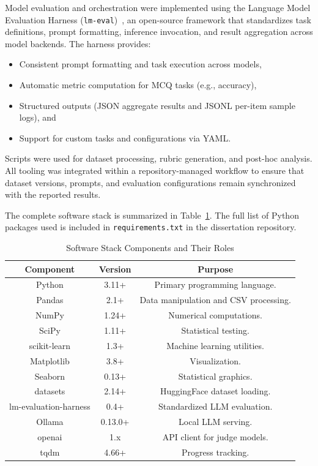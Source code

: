 Model evaluation and orchestration were implemented using the Language Model Evaluation Harness (\texttt{lm-eval})~\cite{gao_LanguageModelEvaluation_2024, eleutherai_EleutherAILmevaluationharness_2024, biderman_LessonsTrenchesReproducible_2024}, an open-source framework that standardizes task definitions, prompt formatting, inference invocation, and result aggregation across model backends. The harness provides:
\begin{itemize}
    \item Consistent prompt formatting and task execution across models,
    \item Automatic metric computation for MCQ tasks (e.g., accuracy),
    \item Structured outputs (JSON aggregate results and JSONL per-item sample logs), and
    \item Support for custom tasks and configurations via YAML.
\end{itemize}

Scripts were used for dataset processing, rubric generation, and post-hoc analysis. All tooling was integrated within a repository-managed workflow to ensure that dataset versions, prompts, and evaluation configurations remain synchronized with the reported results.

The complete software stack is summarized in Table~\ref{tab:software_stack}. The full list of Python packages used is included in \texttt{requirements.txt} in the dissertation repository.




\begin{table}[h!]
    \centering
    \caption{{Software Stack Components and Their Roles}}
    \label{tab:software_stack}
    \begin{tabular}{ccc}
    \hline
    \textbf{Component} & \textbf{Version} & \textbf{Purpose} \\
    \hline
    Python & 3.11+ & Primary programming language. \\
    Pandas & 2.1+ & Data manipulation and CSV processing. \\
    NumPy & 1.24+ & Numerical computations. \\
    SciPy & 1.11+ & Statistical testing. \\
    scikit-learn & 1.3+ & Machine learning utilities. \\
    Matplotlib & 3.8+ & Visualization. \\
    Seaborn & 0.13+ & Statistical graphics. \\
    datasets & 2.14+ & HuggingFace dataset loading. \\
    lm-evaluation-harness & 0.4+ & Standardized LLM evaluation. \\
    Ollama & 0.13.0+ & Local LLM serving. \\
    openai & 1.x & API client for judge models. \\
    tqdm & 4.66+ & Progress tracking. \\
    \hline
    \end{tabular}%
\end{table}



